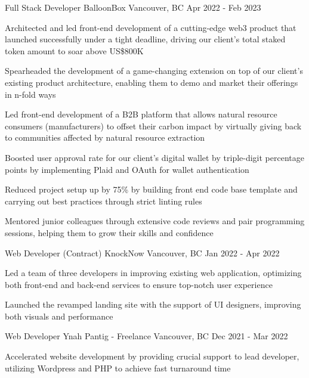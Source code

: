 
\begin{cventries}
  \cventry
    {Full Stack Developer} %
    {BalloonBox} %
    {Vancouver, BC} %
    {Apr 2022 - Feb 2023} %
    {
      \begin{cvitems} %
        \item{Architected and led front-end development of a cutting-edge web3 product that launched successfully under a tight deadline, driving our client's total staked token amount to soar above US\$800K}
        \item{Spearheaded the development of a game-changing extension on top of our client's existing product architecture, enabling them to demo and market their offerings in n-fold ways}
        \item{Led front-end development of a B2B platform that allows natural resource consumers (manufacturers) to offset their carbon impact by virtually giving back to communities affected by natural resource extraction}
        \item{Boosted user approval rate for our client's digital wallet by triple-digit percentage points by implementing Plaid and OAuth for wallet authentication}
        \item{Reduced project setup up by 75\% by building front end code base template and carrying out best practices through strict linting rules}
        \item{Mentored junior colleagues through extensive code reviews and pair programming sessions, helping them to grow their skills and confidence}
      \end{cvitems}
    }

  \cventry
    {Web Developer (Contract)} %
    {KnockNow} %
    {Vancouver, BC} %
    {Jan 2022 - Apr 2022} %
    {
      \begin{cvitems} %
        \item{Led a team of three developers in improving existing web application, optimizing both front-end and back-end services to ensure top-notch user experience}
        \item{Launched the revamped landing site with the support of UI designers, improving both visuals and performance}
      \end{cvitems}
    }

  \cventry
    {Web Developer} %
    {Ynah Pantig - Freelance} %
    {Vancouver, BC} %
    {Dec 2021 - Mar 2022} %
    {
      \begin{cvitems} %
        \item {Accelerated website development by providing crucial support to lead developer, utilizing Wordpress and PHP to achieve fast turnaround time}
      \end{cvitems}
    }


\end{cventries}
